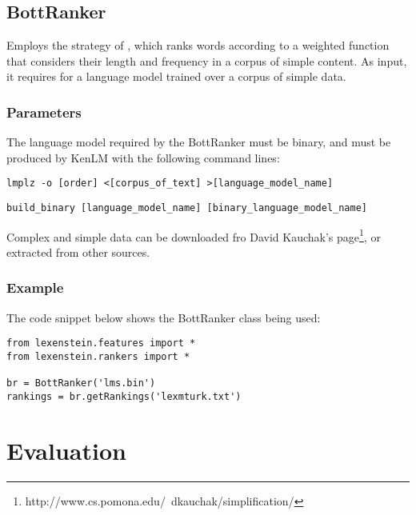 \subsection{BottRanker}

Employs the strategy of \cite{Bott2012}, which ranks words according to a weighted function that considers their length and frequency in a corpus of simple content. As input, it requires for a language model trained over a corpus of simple data.

\subsubsection{Parameters}

The language model required by the BottRanker must be binary, and must be produced by KenLM with the following command lines:

\begin{lstlisting}
lmplz -o [order] <[corpus_of_text] >[language_model_name]
\end{lstlisting}
\begin{lstlisting}
build_binary [language_model_name] [binary_language_model_name]
\end{lstlisting}

Complex and simple data can be downloaded fro David Kauchak's page\footnote{http://www.cs.pomona.edu/~dkauchak/simplification/}, or extracted from other sources.

\subsubsection{Example}

The code snippet below shows the BottRanker class being used:

\begin{lstlisting}
from lexenstein.features import *
from lexenstein.rankers import *

br = BottRanker('lms.bin')
rankings = br.getRankings('lexmturk.txt')
\end{lstlisting}















\section{Evaluation}

